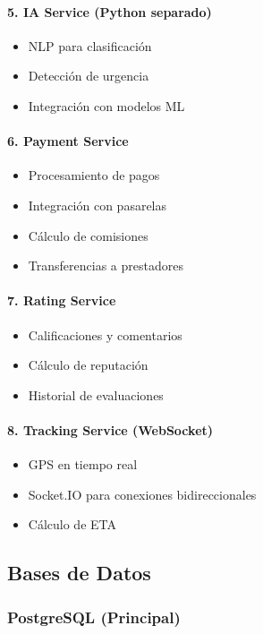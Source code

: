 \documentclass[12pt,a4paper,spanish]{article}
\begin{document}
\paragraph{5. IA Service (Python separado)}
\begin{itemize}
    \item NLP para clasificación
    \item Detección de urgencia
    \item Integración con modelos ML
\end{itemize}

\paragraph{6. Payment Service}
\begin{itemize}
    \item Procesamiento de pagos
    \item Integración con pasarelas
    \item Cálculo de comisiones
    \item Transferencias a prestadores
\end{itemize}

\paragraph{7. Rating Service}
\begin{itemize}
    \item Calificaciones y comentarios
    \item Cálculo de reputación
    \item Historial de evaluaciones
\end{itemize}

\paragraph{8. Tracking Service (WebSocket)}
\begin{itemize}
    \item GPS en tiempo real
    \item Socket.IO para conexiones bidireccionales
    \item Cálculo de ETA
\end{itemize}

\subsection{Bases de Datos}

\subsubsection{PostgreSQL (Principal)}
\end{document}
